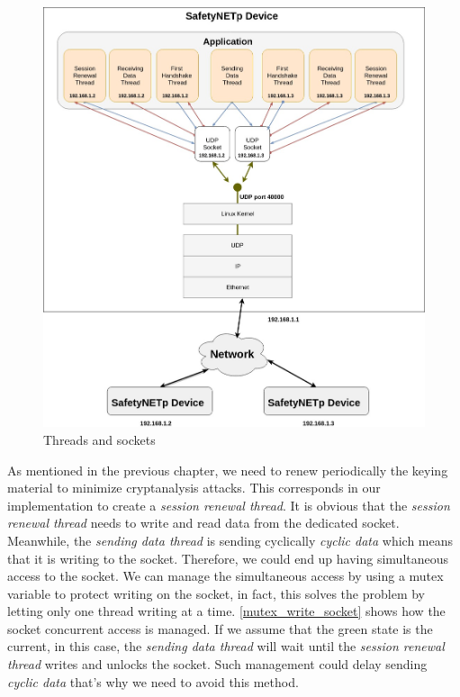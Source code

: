 \begin{figure}[H]
\centering
\includegraphics[width=13cm]{figures/realization/sockets.jpg}
\caption{Threads and sockets}\label{sockets}
\end{figure}

As mentioned in the previous chapter, we need to renew periodically the keying material to minimize cryptanalysis
attacks. This corresponds in our implementation to create a \textit{session renewal thread}. It is obvious that the \textit{session renewal thread} needs to write and read data from the dedicated socket. Meanwhile, the \textit{sending data thread} is
sending cyclically \textit{cyclic data} which means that it is writing to the socket. Therefore, we could end up
having simultaneous access to the socket. We can manage the simultaneous access by using a mutex variable to
protect writing on the socket, in fact, this solves the problem by letting only one thread writing at a time.
\autoref{mutex_write_socket} shows how the socket concurrent access is managed. If we assume that the green state is the
current, in this case, the \textit{sending data thread} will wait until the \textit{session renewal thread} writes and unlocks
the socket. Such management could delay sending \textit{cyclic data} that's why we need to avoid this method.

